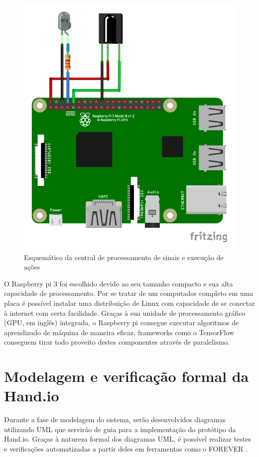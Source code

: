 \begin{figure}[ht]
    \centering
    \includegraphics{resources/esquematico_central_bb.pdf}
    \caption{Esquemático da central de processamento de sinais e execução de ações}
    \label{fig:esq_central}
\end{figure}

O Raspberry pi 3 \cite{raspberry:pi3} foi escolhido devido ao seu tamanho compacto e sua alta capacidade de processamento. Por se tratar de um computador completo em uma placa é possível instalar uma distribuição de Linux com capacidade de se conectar à internet com certa facilidade. Graças à sua unidade de processamento gráfico (GPU, em inglês) integrada, o Raspberry pi consegue executar algoritmos de aprendizado de máquina de maneira eficaz, frameworks como o TensorFlow conseguem tirar todo proveito destes componentes através de paralelismo.

\section{Modelagem e verificação formal da Hand.io}

Durante a fase de modelagem do sistema, serão desenvolvidos diagramas utilizando UML que servirão de guia para a implementação do protótipo da Hand.io. Graças à natureza formal dos diagramas UML, é possível realizar testes e verificações automatizadas a partir deles em ferramentas como o FOREVER \cite{forever}.

